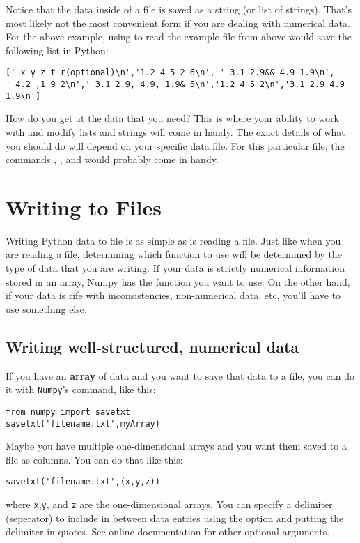 Notice that the data inside of a file is saved as a string (or list of
strings). That's most likely not the most convenient form if you are
dealing with numerical data.  For the above example, using
 to read the example file from above would save the
following list in Python:
\begin{Verbatim}
[' x y z t r(optional)\n','1.2 4 5 2 6\n', ' 3.1 2.9&& 4.9 1.9\n',
' 4.2 ,1 9 2\n',' 3.1 2.9, 4.9, 1.9& 5\n','1.2 4 5 2\n','3.1 2.9 4.9 1.9\n']
\end{Verbatim}
How do you get at the data that you need?  This is where your ability
to work with and modify lists and strings will come in handy.  The
exact details of what you should do will depend on your specific data
file.  For this particular file, the commands ,
, and  would probably come in handy.

\section{Writing to Files}
Writing Python data to file is as simple as is reading a file.  Just
like when you are reading a file, determining which function to use
will be determined by the type of data that you are writing.  If your
data is strictly numerical information stored in an array, Numpy has
the function you want to use.  On the other hand, if your data is rife
with inconsistencies, non-numerical data, etc, you'll have to use
something else.

\subsection*{Writing well-structured, numerical data}
If you have an {\bf array} of data and you want to save that data to a
file, you can do it with \texttt{Numpy}'s  command, like
this:
\begin{Verbatim}
from numpy import savetxt
savetxt('filename.txt',myArray)
\end{Verbatim}
Maybe you have multiple one-dimensional arrays and you want them saved
to a file as columns.  You can do that like this:
\begin{Verbatim}
savetxt('filename.txt',(x,y,z))
\end{Verbatim}
where \texttt{x},\texttt{y}, and \texttt{z} are the one-dimensional
arrays. You can specify a delimiter (seperator) to include in between
data entries using the  option and putting the
delimiter in quotes.  See online documentation for other optional
arguments.

